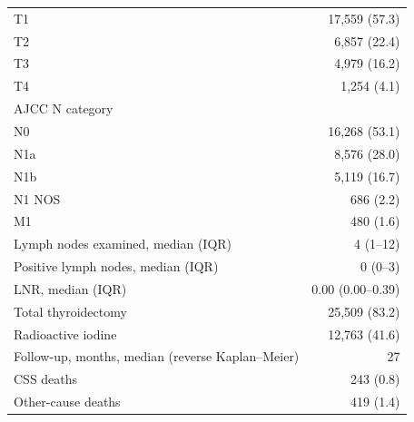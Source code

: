 \begin{table}[htbp]
\begin{tabular*}{\textwidth}{@{\extracolsep{\fill}}lr@{}}
   T1 & 17,559 (57.3) \\
   T2 & 6,857 (22.4) \\
   T3 & 4,979 (16.2) \\
   T4 & 1,254 (4.1) \\
AJCC N category &  \\
   N0 & 16,268 (53.1) \\
   N1a & 8,576 (28.0) \\
   N1b & 5,119 (16.7) \\
   N1 NOS & 686 (2.2) \\
M1 & 480 (1.6) \\
Lymph nodes examined, median (IQR) & 4 (1--12) \\
Positive lymph nodes, median (IQR) & 0 (0--3) \\
LNR, median (IQR) & 0.00 (0.00--0.39) \\
Total thyroidectomy & 25,509 (83.2) \\
Radioactive iodine & 12,763 (41.6) \\
Follow-up, months, median (reverse Kaplan--Meier) & 27 \\
CSS deaths & 243 (0.8) \\
Other-cause deaths & 419 (1.4) \\
\bottomrule
\end{tabular*}
\smallskip{}
\end{table}
